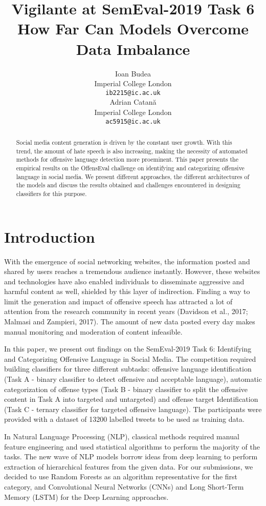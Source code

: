 \documentclass[11pt,a4paper]{article}
\title{Vigilante at SemEval-2019 Task 6 \\ How Far Can Models Overcome Data Imbalance}
\author{Ioan Budea \\
  Imperial College London \\
  {\tt ib2215@ic.ac.uk} \\\And
  Adrian Catan\u{a} \\
  Imperial College London \\
  {\tt ac5915@ic.ac.uk} \\}
\date{}
\begin{document}
\maketitle
\begin{abstract}
Social media content generation is driven by the constant user growth. With this trend, the amount of hate speech is also increasing, making the necessity of automated methods for offensive language detection more proeminent. This paper presents the empirical results on the OffensEval challenge on identifying and categorizing offensive language in social media. We present different approaches, the different architectures of the models and discuss the results obtained and challenges encountered in designing classifiers for this purpose.
\end{abstract}

\section{Introduction}
With the emergence of social networking websites, the information posted and shared by users reaches a tremendous audience instantly. However, these websites and technologies have also enabled individuals to disseminate aggressive and harmful content as well, shielded by this layer of indirection. Finding a way to limit the generation and impact of offensive speech has attracted a lot of attention from the research community in recent years (Davidson et al., 2017; Malmasi and Zampieri, 2017). The amount of new data posted every day makes manual monitoring and moderation of content infeasible.

In this paper, we present out findings on the SemEval-2019 Task 6: Identifying and Categorizing Offensive Language in Social Media. The competition required building classifiers for three different subtasks: offensive language identification (Task A - binary classifier to detect offensive and acceptable language), automatic categorization of offense types (Task B - binary classifier to split the offensive content in Task A into targeted and untargeted) and offense target Identification (Task C - ternary classifier for targeted offensive language). The participants were provided with a dataset of 13200 labelled tweets to be used as training data.

In Natural Language Processing (NLP), classical methods required manual feature engineering and used statistical algorithms to perform the majority of the tasks. The new wave of NLP models borrow ideas from deep learning to perform extraction of hierarchical features from the given data. For our submissions, we decided to use Random Forests as an algorithm representative for the first category, and Convolutional Neural Networks (CNNs) and Long Short-Term Memory (LSTM) for the Deep Learning approaches.
\end{document}
